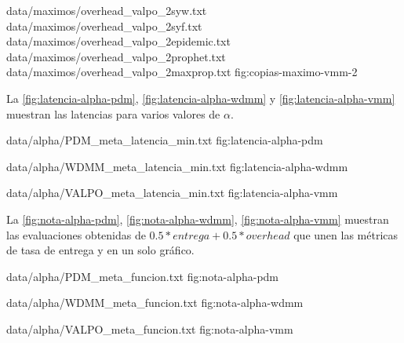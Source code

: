 {
{data/maximos/overhead_valpo_2syw.txt}
{data/maximos/overhead_valpo_2syf.txt}
{data/maximos/overhead_valpo_2epidemic.txt}
{data/maximos/overhead_valpo_2prophet.txt}
{data/maximos/overhead_valpo_2maxprop.txt}
}{fig:copias-maximo-vmm-2}




La \ref{fig:latencia-alpha-pdm}, \ref{fig:latencia-alpha-wdmm} y
\ref{fig:latencia-alpha-vmm} muestran las latencias para varios valores de
$\alpha$.

{
{data/alpha/PDM_meta_latencia_min.txt}
}{fig:latencia-alpha-pdm}


{
{data/alpha/WDMM_meta_latencia_min.txt}
}{fig:latencia-alpha-wdmm}


{
{data/alpha/VALPO_meta_latencia_min.txt}
}{fig:latencia-alpha-vmm}


La \ref{fig:nota-alpha-pdm}, \ref{fig:nota-alpha-wdmm}, \ref{fig:nota-alpha-vmm}
muestran las evaluaciones obtenidas de $0.5*entrega + 0.5*overhead$ que unen las
métricas de tasa de entrega y \overhead{} en un solo gráfico.


{
{data/alpha/PDM_meta_funcion.txt}
}{fig:nota-alpha-pdm}


{
{data/alpha/WDMM_meta_funcion.txt}
}{fig:nota-alpha-wdmm}

{
{data/alpha/VALPO_meta_funcion.txt}
}{fig:nota-alpha-vmm}


